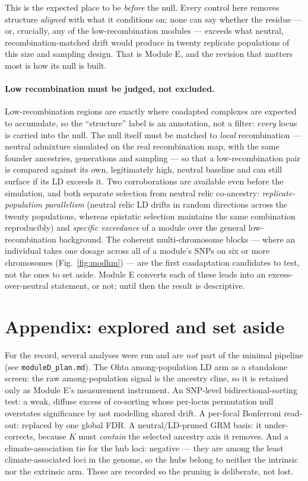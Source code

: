 \documentclass[11pt]{article}
\begin{document}
This is the expected place to be \emph{before} the null. Every control here removes
structure \emph{aligned} with what it conditions on; none can say whether the residue ---
or, crucially, any of the low-recombination modules --- exceeds what neutral,
recombination-matched drift would produce in twenty replicate populations of this size and
sampling design. That is Module E, and the revision that matters most is how its null is
built.

\paragraph{Low recombination must be judged, not excluded.} Low-recombination regions are
exactly where coadapted complexes are expected to accumulate, so the ``structure'' label is
an annotation, not a filter: \emph{every} locus is carried into the null. The null itself
must be matched to \emph{local} recombination --- neutral admixture simulated on the real
recombination map, with the same founder ancestries, generations and sampling --- so that a
low-recombination pair is compared against its own, legitimately high, neutral baseline and
can still surface if its LD exceeds it. Two corroborations are available even before the
simulation, and both separate selection from neutral relic co-ancestry:
\emph{replicate-population parallelism} (neutral relic LD drifts in random directions across
the twenty populations, whereas epistatic selection maintains the same combination
reproducibly) and \emph{specific exceedance} of a module over the general low-recombination
background. The coherent multi-chromosome blocks --- where an individual takes one dosage
across all of a module's SNPs on six or more chromosomes (Fig.~\ref{fig:modhm}) --- are the
first coadaptation candidates to test, not the ones to set aside. Module E converts each of
these leads into an excess-over-neutral statement, or not; until then the result is
descriptive.

\section*{Appendix: explored and set aside}

For the record, several analyses were run and are \emph{not} part of the minimal pipeline
(see \texttt{moduleD\_plan.md}). The Ohta among-population LD arm as a standalone screen: the
raw among-population signal is the ancestry cline, so it is retained only as Module E's
measurement instrument. An SNP-level bidirectional-sorting test: a weak, diffuse excess of
co-sorting whose per-locus permutation null overstates significance by not modelling shared
drift. A per-focal Bonferroni read-out: replaced by one global FDR. A neutral/LD-pruned GRM
basis: it under-corrects, because $K$ must \emph{contain} the selected ancestry axis it
removes. And a climate-association tie for the hub loci: negative --- they are among the
least climate-associated loci in the genome, so the hubs belong to neither the intrinsic nor
the extrinsic arm. These are recorded so the pruning is deliberate, not lost.
\end{document}

